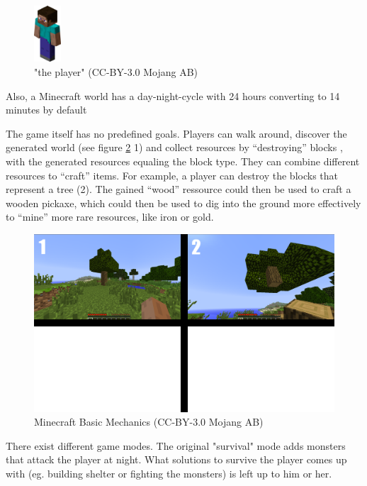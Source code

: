 \begin{figure}[h]
  \centering
    \includegraphics[width=1cm]{graphics/player}
  \caption{"the player" (CC-BY-3.0 Mojang AB) \cite{image_mob}}
  \label{mc_player}
\end{figure}

Also, a Minecraft world has a day-night-cycle with 24 hours converting to 14 minutes by default

The game itself has no predefined goals. Players can walk around, discover the generated world (see figure \ref{mc_mechanics} 1) and collect resources by ``destroying'' blocks , with the generated resources equaling the block type. They can combine different resources to ``craft'' items. For example, a player can destroy the blocks that represent a tree (2). The gained ``wood'' ressource could then be used to craft a wooden pickaxe, which could then be used to dig into the ground more effectively to ``mine'' more rare resources, like iron or gold.

\begin{figure}[h]
  \centering
    \includegraphics[width=15cm]{graphics/minecraft_mechanics}
  \caption{Minecraft Basic Mechanics  (CC-BY-3.0 Mojang AB) \cite{image_mob}} %
  \label{mc_mechanics}
\end{figure}

There exist different game modes. The original "survival" mode adds monsters that attack the player at night. What solutions to survive the player comes up with (eg. building shelter or fighting the monsters) is left up to him or her.

